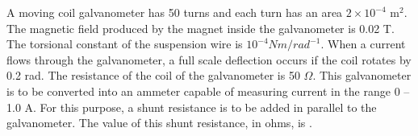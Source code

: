 \item A moving coil galvanometer has 50 turns and each turn has an area \(2 \times 10^{-4}\) m\(^2\). The magnetic field produced by the magnet inside the galvanometer is 0.02 T. The torsional constant of the suspension wire is \(10^{-4} N m/rad^{-1}\). When a current flows through the galvanometer, a full scale deflection occurs if the coil rotates by 0.2 rad. The resistance of the coil of the galvanometer is 50 \(\Omega\). This galvanometer is to be converted into an ammeter capable of measuring current in the range 0 – 1.0 A. For this purpose, a shunt resistance is to be added in parallel to the galvanometer. The value of this shunt resistance, in ohms, is \underline{\hspace{3cm}}.
